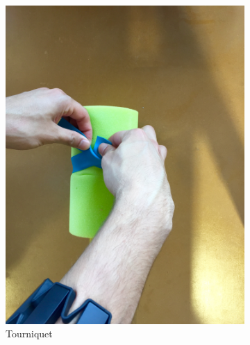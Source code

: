 \begin{figure}[b]
\begin{subfigure}[b]{0.18\textwidth}
		\includegraphics[width=\textwidth]{pictures/tourniquet}
		\caption{Tourniquet}
		\label{fig:tourniquet}
	\end{subfigure}
	~ %
	\begin{subfigure}[b]{0.18\textwidth}

\end{subfigure}
\end{figure}
